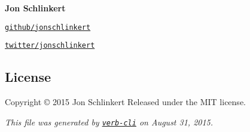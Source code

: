 {\bfseries Jon Schlinkert}


\begin{DoxyItemize}
\item \href{https://github.com/jonschlinkert}{\tt github/jonschlinkert}
\item \href{http://twitter.com/jonschlinkert}{\tt twitter/jonschlinkert}
\end{DoxyItemize}

\subsection*{License}

Copyright © 2015 Jon Schlinkert Released under the M\+IT license.





{\itshape This file was generated by \href{https://github.com/assemble/verb-cli}{\tt verb-\/cli} on August 31, 2015.} 